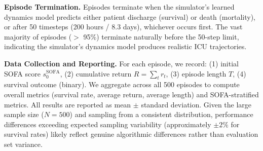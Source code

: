 \textbf{Episode Termination.} Episodes terminate when the simulator's learned dynamics model predicts either patient discharge (survival) or death (mortality), or after 50 timesteps (200 hours / 8.3 days), whichever occurs first. The vast majority of episodes ($>$ 95\%) terminate naturally before the 50-step limit, indicating the simulator's dynamics model produces realistic ICU trajectories.

\textbf{Data Collection and Reporting.} For each episode, we record: (1) initial SOFA score $s_0^{\text{SOFA}}$, (2) cumulative return $R = \sum_t r_t$, (3) episode length $T$, (4) survival outcome (binary). We aggregate across all 500 episodes to compute overall metrics (survival rate, average return, average length) and SOFA-stratified metrics. All results are reported as mean $\pm$ standard deviation. Given the large sample size ($N = 500$) and sampling from a consistent distribution, performance differences exceeding expected sampling variability (approximately $\pm 2\%$ for survival rates) likely reflect genuine algorithmic differences rather than evaluation set variance.

